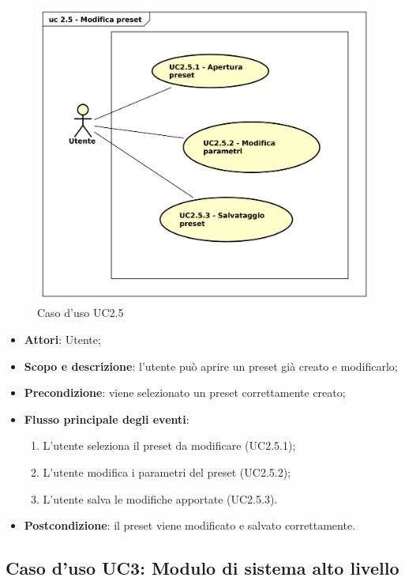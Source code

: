 \begin{figure}[htbp]
\centering
\includegraphics[scale=0.5]{UseCase_17_03_2016/immagini/uc_2_5_modifica_preset.png}
\captionsetup{labelfont=bf}
\caption{Caso d'uso UC2.5}
\end{figure}

\begin{itemize}
\item \textbf{Attori}: Utente;
\item \textbf{Scopo e descrizione}: l'utente può aprire un preset già creato e modificarlo;
\item \textbf{Precondizione}: viene selezionato un preset correttamente creato; 
\item \textbf{Flusso principale degli eventi}:
\begin{enumerate}
\item L'utente seleziona il preset da modificare (UC2.5.1);
\item L'utente modifica i parametri del preset (UC2.5.2);
\item L'utente salva le modifiche apportate (UC2.5.3).
\end{enumerate}
\item \textbf{Postcondizione}: il preset viene modificato e salvato correttamente.
\end{itemize}

\subsection{Caso d'uso UC3: Modulo di sistema alto livello}

